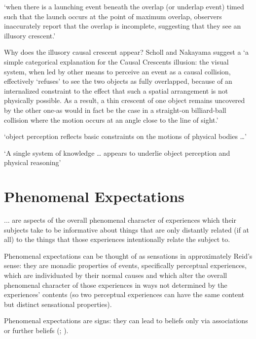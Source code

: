 \documentclass[12pt]{extarticle}
\begin{document}
\begin{multicols*}{3}
‘when there is a launching event beneath the overlap (or underlap event) timed such that
the launch occurs at the point of maximum overlap, observers inaccurately report that
the overlap is incomplete, suggesting that they see an illusory crescent.’
\citep[p.\ 461]{Scholl:2004dx}

Why does the illusory causal crescent appear?  Scholl and Nakayama suggest a
‘a simple categorical explanation for the Causal Crescents illusion: the visual system,
when led by other means to perceive an event as a causal collision, effectively
‘refuses’ to see the two objects as fully overlapped, because of an internalized
constraint to the effect that such a spatial arrangement is not physically possible.
As a result, a thin crescent of one object remains uncovered by the other one-as
would in fact be the case in a straight-on billiard-ball collision where the motion
occurs at an angle close to the line of sight.’
\citep[p.\ 466]{Scholl:2004dx}

‘object perception reflects basic constraints on the motions of physical bodies …’
\citep[p.\ 51]{Spelke:1990jn}

‘A single system of  knowledge  … appears to underlie object perception and physical reasoning’
\citep[p.\ 175]{Carey:1994bh}



\section{Phenomenal Expectations}


... are aspects of the overall phenomenal character of experiences which their subjects take to be informative about things that are only distantly related (if at all) to the things that those experiences intentionally relate the subject to.

Phenomenal expectations can be thought of as sensations in approximately Reid’s sense: they are monadic properties of events, specifically perceptual experiences,
which are individuated by their normal causes
and which alter the overall phenomenal character of those experiences in ways not determined by the experiences’ contents
(so two perceptual experiences can have the same content but distinct sensational properties).

Phenomenal expectations are signs:
they can lead to beliefs only via associations or further beliefs
(\citealp[Essay~II, Chap.~16, p.~228]{Reid:1785cj};
\citealp[Chap.~VI sect.~III, pp.~164–5]{Reid:1785nz}).





\footnotesize


\end{multicols*}
\end{document}
